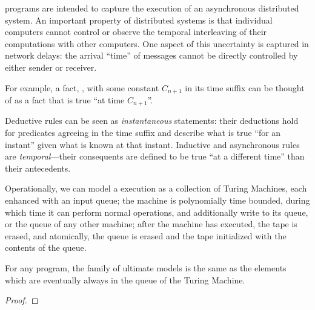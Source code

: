 \lang programs are intended to capture the execution of an asynchronous distributed system.  An important property of distributed systems is that individual computers cannot control or observe the temporal interleaving of their computations with other computers.  One aspect of this uncertainty is captured in network delays: the arrival ``time'' of messages cannot be directly controlled by either sender or receiver.

For example, a fact, , with some constant $C_{n+1}$ in its time
suffix can be thought of as a fact that is true ``at time $C_{n+1}$''.

Deductive rules can be seen as {\em instantaneous} statements: their deductions hold for 
predicates agreeing in the time suffix and describe what is true ``for an instant'' given 
what is known at that instant.
 Inductive and asynchronous 
 rules are {\em temporal}---their consequents are defined to
be true ``at a different time'' than their antecedents.

Operationally, we can model a \lang execution as a collection of Turing Machines, each enhanced with an input queue; the machine is polynomially time bounded, during which time it can perform normal operations, and additionally write to its queue, or the queue of any other machine; after the machine has executed, the tape is erased, and atomically, the queue is erased and the tape initialized with the contents of the queue. 

\begin{lemma}
For any \lang program, the family of ultimate models is the same as the elements which are eventually always in the queue of the Turing Machine. 
\end{lemma}
\begin{proof}
\end{proof}


%
